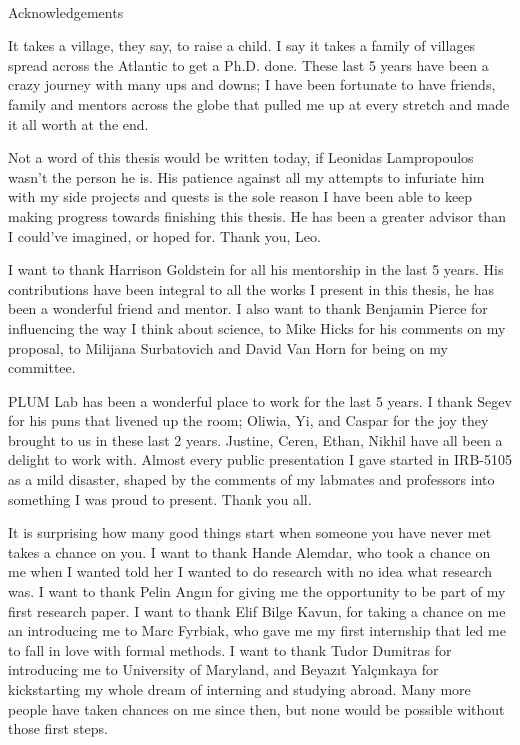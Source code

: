 
\renewcommand{\baselinestretch}{2}

\small\normalsize
\hbox{\ }

\vspace*{-.85in}

\begin{center}
    \large{Acknowledgements}
\end{center}

\vspace{1ex}

It takes a village, they say, to raise a child. I say it takes a family of villages
spread across the Atlantic to get a Ph.D. done. These last 5 years have been a crazy
journey with many ups and downs; I have been fortunate to have friends, family and
mentors across the globe that pulled me up at every stretch and made it all worth at
the end.

Not a word of this thesis would be written today, if Leonidas Lampropoulos wasn't the
person he is. His patience against all my attempts to infuriate him with my side
projects and quests is the sole reason I have been able to keep making progress towards
finishing this thesis. He has been a greater advisor than I could've imagined, or hoped
for. Thank you, Leo.

I want to thank Harrison Goldstein for all his mentorship in the last 5 years. His
contributions have been integral to all the works I present in this thesis, he has been
a wonderful friend and mentor. I also want to thank Benjamin Pierce for influencing the
way I think about science, to Mike Hicks for his comments on my proposal, to Milijana
Surbatovich and David Van Horn for being on my committee.

PLUM Lab has been a wonderful place to work for the last 5 years. I thank Segev for his
puns that livened up the room; Oliwia, Yi, and Caspar for the joy they brought to us in
these last 2 years. Justine, Ceren, Ethan, Nikhil have all been a delight to work with.
Almost every public presentation I gave started in IRB-5105 as a mild disaster, shaped
by the comments of my labmates and professors into something I was proud to present.
Thank you all.

It is surprising how many good things start when someone you have never met takes a
chance on you. I want to thank Hande Alemdar, who took a chance on me when I wanted
told her I wanted to do research with no idea what research was. I want to thank Pelin
Angın for giving me the opportunity to be part of my first research paper. I want to
thank Elif Bilge Kavun, for taking a chance on me an introducing me to Marc Fyrbiak,
who gave me my first internship that led me to fall in love with formal methods. I want
to thank Tudor Dumitras for introducing me to University of Maryland, and Beyazıt
Yalçınkaya for kickstarting my whole dream of interning and studying abroad. Many more
people have taken chances on me since then, but none would be possible without those
first steps.

